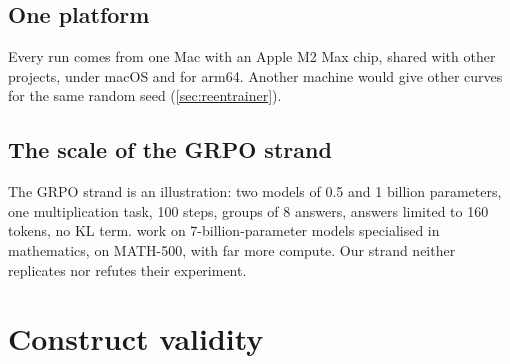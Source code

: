 \subsection{One platform}

Every run comes from one Mac with an Apple M2 Max chip, shared with other projects, under macOS and
for arm64. Another machine would give other curves for the same random seed
(\cref{sec:reentrainer}).

\subsection{The scale of the GRPO strand}

The GRPO strand is an illustration: two models of 0.5 and 1 billion parameters, one multiplication
task, 100 steps, groups of 8 answers, answers limited to 160 tokens, no KL term.
\textcite{shao2025spurious} work on 7-billion-parameter models specialised in mathematics, on
MATH-500, with far more compute. Our strand neither replicates nor refutes their experiment.

\section{Construct validity}
\label{sec:val-construit}

